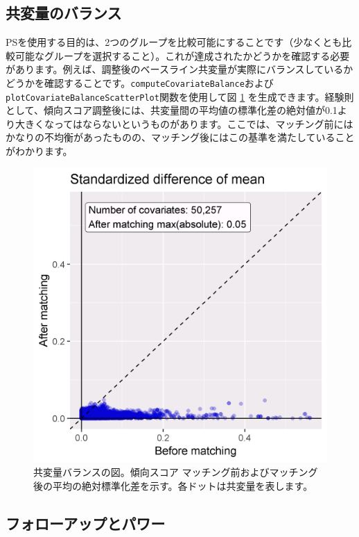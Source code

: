 \documentclass[
  11pt]{book}
\theoremstyle{definition}
\theoremstyle{definition}
\theoremstyle{definition}
\theoremstyle{definition}
\theoremstyle{remark}
\begin{document}
\subsection{共変量のバランス}\label{ux5171ux5909ux91cfux306eux30d0ux30e9ux30f3ux30b9}

PSを使用する目的は、2つのグループを比較可能にすることです（少なくとも比較可能なグループを選択すること）。これが達成されたかどうかを確認する必要があります。例えば、調整後のベースライン共変量が実際にバランスしているかどうかを確認することです。\texttt{computeCovariateBalance}および\texttt{plotCovariateBalanceScatterPlot}関数を使用して図 \ref{fig:balance} を生成できます。経験則として、傾向スコア調整後には、共変量間の平均値の標準化差の絶対値が0.1より大きくなってはならないというものがあります。ここでは、マッチング前にはかなりの不均衡があったものの、マッチング後にはこの基準を満たしていることがわかります。 

\begin{figure}

{\centering \includegraphics[width=0.7\linewidth]{images/PopulationLevelEstimation/balance} 

}

\caption{共変量バランスの図。傾向スコア マッチング前およびマッチング後の平均の絶対標準化差を示す。各ドットは共変量を表します。}\label{fig:balance}
\end{figure}

\subsection{フォローアップとパワー}\label{ux30d5ux30a9ux30edux30fcux30a2ux30c3ux30d7ux3068ux30d1ux30efux30fc}
\end{document}
